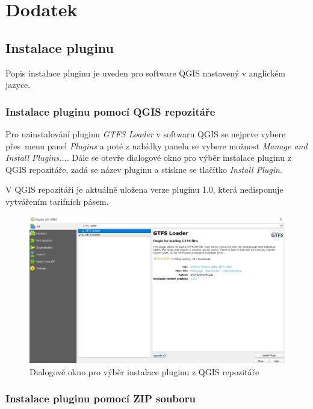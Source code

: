 \chapter{Dodatek}
\label{dodatek}

\section{Instalace pluginu}

Popis instalace pluginu je uveden pro software QGIS nastavený v anglickém jazyce. 

\subsection{Instalace pluginu pomocí QGIS repozitáře}

Pro nainstalování pluginu \textit{GTFS Loader} v softwaru QGIS se nejprve vybere přes~me\-nu 
panel \textit{Plugins} a poté z nabídky panelu se vybere možnost \textit{Manage and Install Plugins...}.
Dále se otevře dialogové okno pro výběr instalace pluginu z QGIS repo\-zitáře, zadá se název
pluginu a stiskne se tlačítko \textit{Install Plugin}.

V QGIS repozitáři je aktuálně uložena verze pluginu 1.0, která nedisponuje vytvářením
tarifních pásem.  

\begin{figure}[H] \centering
    \includegraphics[width=400pt]{./pictures-dodatek/repositary.png}
    \caption[Dialogové okno pro výběr instalace pluginu z QGIS repozitáře]{Dialogové okno pro výběr instalace pluginu z QGIS repozitáře}
	\label{fig:repositary}              
\end{figure} 

\subsection{Instalace pluginu pomocí ZIP souboru}

